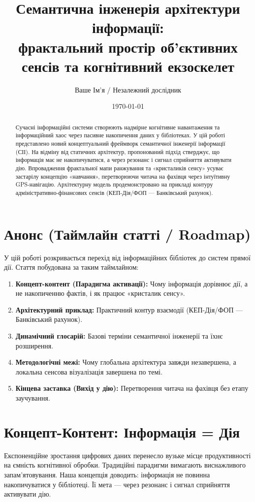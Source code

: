 \documentclass[11pt,a4paper]{article}
\title{\textbf{Семантична інженерія архітектури інформації:\\ фрактальний простір об'єктивних сенсів та когнітивний екзоскелет}}
\author{Ваше Ім'я / Незалежний дослідник}
\date{\today}
\begin{document}
\maketitle

\begin{abstract}
Сучасні інформаційні системи створюють надмірне когнітивне навантаження та інформаційний хаос через пасивне накопичення даних у бібліотеках. У цій роботі представлено новий концептуальний фреймворк семантичної інженерії інформації (СІІ). На відміну від статичних архітектур, пропонований підхід стверджує, що інформація має не накопичуватися, а через резонанс і сигнал сприйняття активувати дію. Впровадження фрактальної мапи ранжування та «кристаликів сенсу» усуває застарілу концепцію «навчання», перетворюючи читача на фахівця через інтуїтивну GPS-навігацію. Архітектурну модель продемонстровано на прикладі контуру адміністративно-фінансових сенсів (КЕП-Дія/ФОП — Банківський рахунок).
\end{abstract}

\section{Анонс (Таймлайн статті / Roadmap)}
У цій роботі розкривається перехід від інформаційних бібліотек до систем прямої дії. Стаття побудована за таким таймлайном:
\begin{enumerate}
    \item \textbf{Концепт-контент (Парадигма активації):} Чому інформація дорівнює дії, а не накопиченню фактів, і як працює «кристалик сенсу».
    \item \textbf{Архітектурний приклад:} Практичний контур взаємодії (КЕП-Дія/ФОП — Банківський рахунок).
    \item \textbf{Динамічний глосарій:} Базові терміни семантичної інженерії та їхнє розширення.
    \item \textbf{Методологічні межі:} Чому глобальна архітектура завжди незавершена, а локальна сенсова візуалізація завершена по темі.
    \item \textbf{Кінцева заставка (Вихід у дію):} Перетворення читача на фахівця без етапу заучування.
\end{enumerate}

\section{Концепт-Контент: Інформація = Дія}
Експоненційне зростання цифрових даних перенесло вузьке місце продуктивності на ємність когнітивної обробки. Традиційні парадигми вимагають виснажливого запам'ятовування. Наша концепція доводить: інформація не повинна накопичуватися у бібліотеці. Її мета — через резонанс і сигнал сприйняття активувати дію. 
\end{document}
